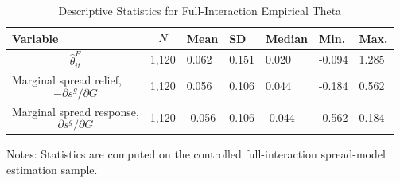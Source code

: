 \begin{table}[H]\centering
\begin{threeparttable}
\caption{Descriptive Statistics for Full-Interaction Empirical Theta}
\label{tab:theta_descriptive_stats}
\scriptsize
\begin{tabularx}{\textwidth}{lYYYYYY}
\toprule
Variable & $$N$$ & Mean & SD & Median & Min. & Max. \\
\midrule
$$\widehat{\theta}^{F}_{it}$$ & 1,120 & 0.062 & 0.151 & 0.020 & -0.094 & 1.285 \\
Marginal spread relief, $$-\partial s^g/\partial G$$ & 1,120 & 0.056 & 0.106 & 0.044 & -0.184 & 0.562 \\
Marginal spread response, $$\partial s^g/\partial G$$ & 1,120 & -0.056 & 0.106 & -0.044 & -0.562 & 0.184 \\
\bottomrule
\end{tabularx}
\begin{tablenotes}[flushleft]\footnotesize
\item Notes: Statistics are computed on the controlled full-interaction spread-model estimation sample.
\end{tablenotes}
\end{threeparttable}
\end{table}
